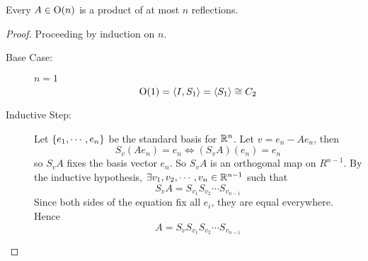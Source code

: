 \documentclass{article}
\begin{document}
\begin{thm}
    Every $A \in \mathrm{O}(n)$ is a product of at most $n$ reflections.
\end{thm}
\begin{proof}
    Proceeding by induction on $n$. 
    \begin{description}
        \item[Base Case: ] $n = 1$ 
        \[
            \mathrm{O}(1) = \left\langle I, S_1\right\rangle = \left\langle S_1\right\rangle \cong C_2  
        \]
        \item[Inductive Step: ] Let $\left\{ e_1, \cdots, e_n \right\}$ be the standard basis for $\mathbb{R}^n$.
        Let $v = e_n - Ae_n$, then
        \[
            S_v(Ae_n) = e_n \Leftrightarrow (S_vA)(e_n) = e_n  
        \]
        so $S_vA$ fixes the basis vector $e_n$. So $S_vA$ is an orthogonal map on $R^{n-1}$. 
        By the inductive hypothesis, $\exists v_1, v_2, \cdots, v_n \in \mathbb{R}^{n-1}$ such that
        \[
            S_vA = S_{v_1}S_{v_2}\cdots S_{v_{n-1}}  
        \]
        Since both sides of the equation fix all $e_i$, they are equal everywhere. Hence
        \[
            A = S_vS_{v_1}S_{v_2}\cdots S_{v_{n-1}} 
        \]
    \end{description}
\end{proof}
\end{document}
